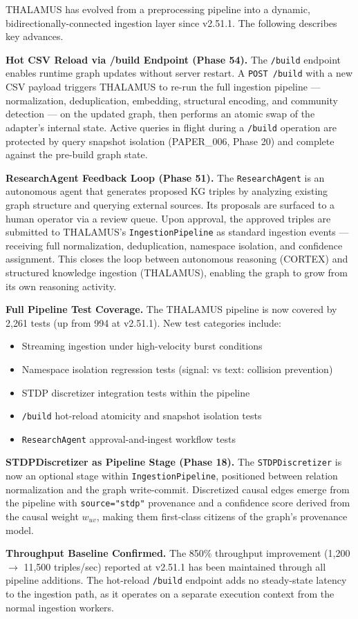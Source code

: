 THALAMUS has evolved from a preprocessing pipeline into a dynamic, bidirectionally-connected ingestion layer since v2.51.1. The following describes key advances.

\textbf{Hot CSV Reload via /build Endpoint (Phase 54).} The \texttt{/build} endpoint enables runtime graph updates without server restart. A \texttt{POST /build} with a new CSV payload triggers THALAMUS to re-run the full ingestion pipeline --- normalization, deduplication, embedding, structural encoding, and community detection --- on the updated graph, then performs an atomic swap of the adapter's internal state. Active queries in flight during a \texttt{/build} operation are protected by query snapshot isolation (PAPER_006, Phase 20) and complete against the pre-build graph state.

\textbf{ResearchAgent Feedback Loop (Phase 51).} The \texttt{ResearchAgent} is an autonomous agent that generates proposed KG triples by analyzing existing graph structure and querying external sources. Its proposals are surfaced to a human operator via a review queue. Upon approval, the approved triples are submitted to THALAMUS's \texttt{IngestionPipeline} as standard ingestion events --- receiving full normalization, deduplication, namespace isolation, and confidence assignment. This closes the loop between autonomous reasoning (CORTEX) and structured knowledge ingestion (THALAMUS), enabling the graph to grow from its own reasoning activity.

\textbf{Full Pipeline Test Coverage.} The THALAMUS pipeline is now covered by 2,261 tests (up from 994 at v2.51.1). New test categories include:
\begin{itemize}
  \item Streaming ingestion under high-velocity burst conditions
  \item Namespace isolation regression tests (signal: vs text: collision prevention)
  \item STDP discretizer integration tests within the pipeline
  \item \texttt{/build} hot-reload atomicity and snapshot isolation tests
  \item \texttt{ResearchAgent} approval-and-ingest workflow tests
\end{itemize}


\textbf{STDPDiscretizer as Pipeline Stage (Phase 18).} The \texttt{STDPDiscretizer} is now an optional stage within \texttt{IngestionPipeline}, positioned between relation normalization and the graph write-commit. Discretized causal edges emerge from the pipeline with \texttt{source="stdp"} provenance and a confidence score derived from the causal weight $w_{uv}$, making them first-class citizens of the graph's provenance model.

\textbf{Throughput Baseline Confirmed.} The 850\% throughput improvement (1,200 $\to$ 11,500 triples/sec) reported at v2.51.1 has been maintained through all pipeline additions. The hot-reload \texttt{/build} endpoint adds no steady-state latency to the ingestion path, as it operates on a separate execution context from the normal ingestion workers.